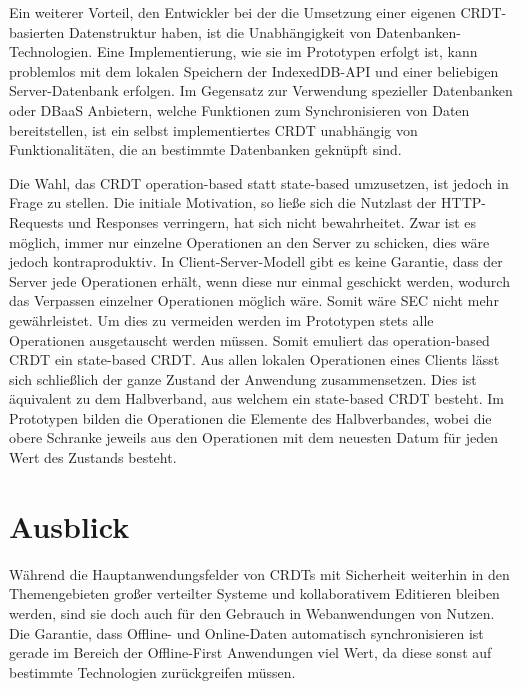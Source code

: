 \documentclass[a4paper, 12pt]{scrreprt}
\begin{document}
Ein weiterer Vorteil, den Entwickler bei der die Umsetzung einer eigenen CRDT-basierten Datenstruktur haben, ist die Unabhängigkeit von Datenbanken-Technologien. Eine Implementierung, wie sie im Prototypen erfolgt ist, kann problemlos mit dem lokalen Speichern der IndexedDB-API und einer beliebigen Server-Datenbank erfolgen. Im Gegensatz zur Verwendung spezieller Datenbanken oder \ac{DBaaS} Anbietern, welche Funktionen zum Synchronisieren von Daten bereitstellen, ist ein selbst implementiertes CRDT unabhängig von Funktionalitäten, die an bestimmte Datenbanken geknüpft sind.

Die Wahl, das CRDT operation-based statt state-based umzusetzen, ist jedoch in Frage zu stellen. Die initiale Motivation, so ließe sich die Nutzlast der HTTP-Requests und Responses verringern, hat sich nicht bewahrheitet. Zwar ist es möglich, immer nur einzelne Operationen an den Server zu schicken, dies wäre jedoch kontraproduktiv. In Client-Server-Modell gibt es keine Garantie, dass der Server jede Operationen erhält, wenn diese nur einmal geschickt werden, wodurch das Verpassen einzelner Operationen möglich wäre. Somit wäre \ac{SEC} nicht mehr gewährleistet. Um dies zu vermeiden werden im Prototypen stets alle Operationen ausgetauscht werden müssen. Somit emuliert das operation-based CRDT ein state-based CRDT. Aus allen lokalen Operationen eines Clients lässt sich schließlich der ganze Zustand der Anwendung zusammensetzen. Dies ist äquivalent zu dem Halbverband, aus welchem ein state-based CRDT besteht. Im Prototypen bilden die Operationen die Elemente des Halbverbandes, wobei die obere Schranke jeweils aus den Operationen mit dem neuesten Datum für jeden Wert des Zustands besteht.

\section{Ausblick}

Während die Hauptanwendungsfelder von CRDTs mit Sicherheit weiterhin in den Themengebieten großer verteilter Systeme und kollaborativem Editieren bleiben werden, sind sie doch auch für den Gebrauch in Webanwendungen von Nutzen. Die Garantie, dass Offline- und Online-Daten automatisch synchronisieren ist gerade im Bereich der Offline-First Anwendungen viel Wert, da diese sonst auf bestimmte Technologien zurückgreifen müssen.
\end{document}
